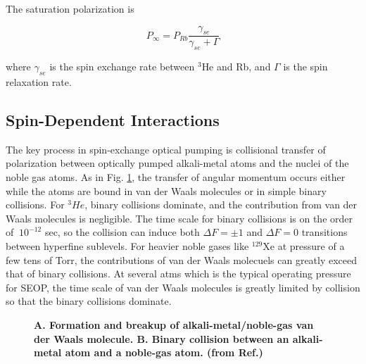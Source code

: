 The saturation polarization is 

\begin{equation}
P_{\infty} = P_{Rb}\frac{\gamma_{se}}{\gamma_{se}+\Gamma}
\end{equation}

where $\gamma_{se}$ is the spin exchange rate between $^{3}$He and Rb, and $\Gamma$ is the spin relaxation rate. 

\subsection{Spin-Dependent Interactions}

The key process in spin-exchange optical pumping is collisional transfer of polarization between optically pumped alkali-metal atoms and the nuclei of the noble gas atoms. As in Fig. \ref{SpinExchange}, the transfer of angular momentum occurs either while the atoms are bound in van der Waals molecules or in simple binary collisions. For $^{3}He$, binary collisions dominate, and the contribution from van der Waals molecules is negligible. The time scale for binary collisions is on the order of $~10^{-12}$ sec, so the collision can induce both $\Delta F=\pm1$ and $\Delta F=0$ transitions between hyperfine sublevels. For heavier noble gases like $^{129}$Xe at pressure of a few tens of Torr, the contributions of van der Waals molecuels can greatly exceed that of binary collisions. At several atms which is the typical operating pressure for SEOP, the time scale of van der Waals molecules is greatly limited by collision so that the binary collisions dominate.

\begin{figure}[t!]
	\centering
	\caption{{\bf A. Formation and breakup of alkali-metal/noble-gas van der Waals molecule. B. Binary collision between an alkali-metal atom and a noble-gas atom. (from Ref.\@ \cite{WalkerHapper})}}
	\label{SpinExchange}
\end{figure}

